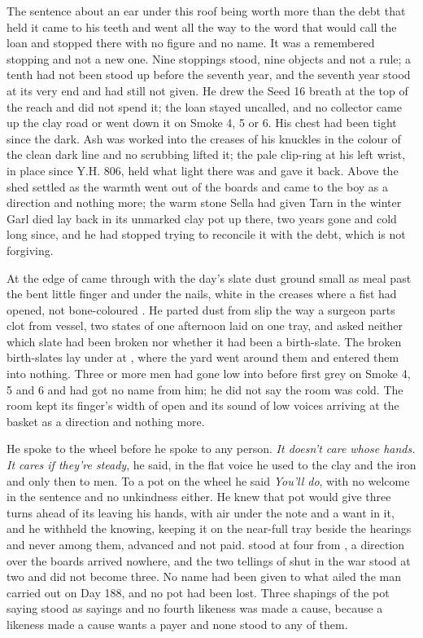 The sentence about an ear under this roof being worth more than the debt that held it came to his teeth and went all the way to the word that would call the loan and stopped there with no figure and no name. It was a remembered stopping and not a new one. Nine stoppings stood, nine objects and not a rule; a tenth had not been stood up before the seventh year, and the seventh year stood at its very end and had still not given. He drew the Seed 16 breath at the top of the reach and did not spend it; the loan stayed uncalled, and no collector came up the clay road or went down it on Smoke 4, 5 or 6. His chest had been tight since the dark. Ash was worked into the creases of his knuckles in the colour of the clean dark line and no scrubbing lifted it; the pale clip-ring at his left wrist, in place since Y.H. 806, held what light there was and gave it back. Above the shed  settled as the warmth went out of the boards and came to the boy as a direction and nothing more; the warm stone Sella had given Tarn in the winter Garl died lay back in its unmarked clay pot up there, two years gone and cold long since, and he had stopped trying to reconcile it with the debt, which is not forgiving.

\scenebreak

At the edge of   came through with the day's slate dust ground small as meal past the bent little finger and under the nails, white in the creases where a fist had opened, not bone-coloured . He parted dust from slip the way a surgeon parts clot from vessel, two states of one afternoon laid on one tray, and asked neither which slate had been broken nor whether it had been a birth-slate. The broken birth-slates lay under  at , where the yard went around them and entered them into nothing. Three or more men had gone low into  before first grey on Smoke 4, 5 and 6 and had got no name from him; he did not say the room was cold. The room kept its finger's width of open and its sound of low voices arriving at the basket as a direction and nothing more.

He spoke to the wheel before he spoke to any person. \emph{It doesn't care whose hands. It cares if they're steady}, he said, in the flat voice he used to the clay and the iron and only then to men. To a pot on the wheel he said \emph{You'll do}, with no welcome in the sentence and no unkindness either. He knew  that pot would give three turns ahead of its leaving his hands, with air under the note and a want in it, and he withheld the knowing, keeping it on the near-full tray beside the hearings and never among them, advanced and not paid.  stood at four from , a direction over the boards arrived nowhere, and the two tellings of  shut in the war stood at two and did not become three. No name had been given to what ailed the man carried out on Day 188, and no pot had been lost. Three shapings of the pot saying stood as sayings and no fourth likeness was made a cause, because a likeness made a cause wants a payer and none stood to any of them.

